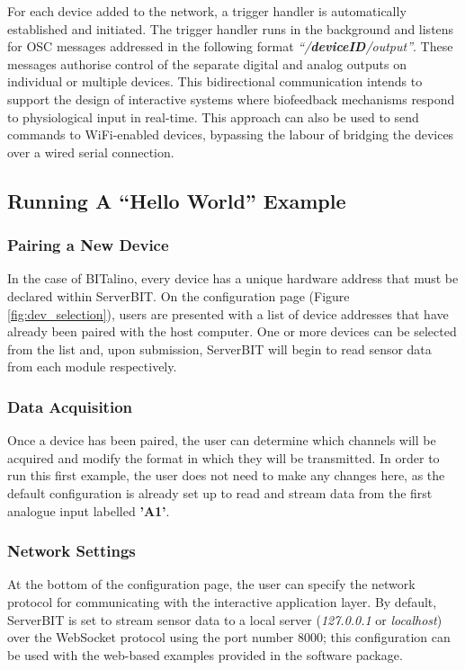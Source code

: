 For each device added to the network, a trigger handler is automatically established and initiated. The trigger handler runs in the background and listens for OSC messages addressed in the following format \textit{``/\textbf{deviceID}/output''}. These messages authorise control of the separate digital and analog outputs on individual or multiple devices. This bidirectional communication intends to support the design of interactive systems where biofeedback mechanisms respond to physiological input in real-time. This approach can also be used to send commands to WiFi-enabled devices, bypassing the labour of bridging the devices over a wired serial connection.

\subsection{Running A ``Hello World'' Example}
\label{serverBIT_run_through}

\subsubsection*{Pairing a New Device} \label{Pairing}
In the case of BITalino, every device has a unique hardware address that must be declared within ServerBIT. On the configuration page (Figure \ref{fig:dev_selection}), users are presented with a list of device addresses that have already been paired with the host computer. One or more devices can be selected from the list and, upon submission, ServerBIT will begin to read sensor data from each module respectively.

\subsubsection*{Data Acquisition}
Once a device has been paired, the user can determine which channels will be acquired and modify the format in which they will be transmitted. In order to run this first example, the user does not need to make any changes here, as the default configuration is already set up to read and stream data from the first analogue input labelled \textbf{'A1'}.

\subsubsection*{Network Settings}
At the bottom of the configuration page, the user can specify the network protocol for communicating with the interactive application layer. By default, ServerBIT is set to stream sensor data to a local server (\textit{127.0.0.1} or \textit{localhost}) over the WebSocket protocol using the port number 8000; this configuration can be used with the web-based examples provided in the software package.

